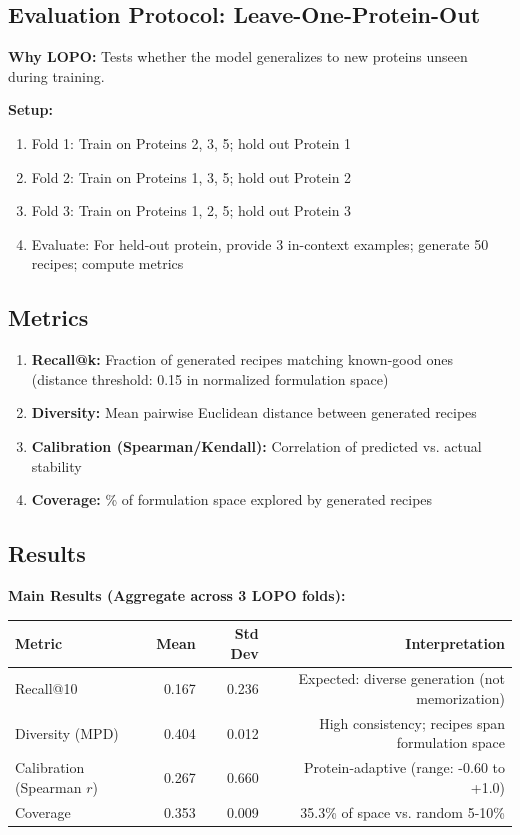 \documentclass[11pt]{article}
\begin{document}
\subsection{Evaluation Protocol: Leave-One-Protein-Out}

\textbf{Why LOPO:} Tests whether the model generalizes to new proteins unseen during training.

\textbf{Setup:}
\begin{enumerate}
    \item Fold 1: Train on Proteins 2, 3, 5; hold out Protein 1
    \item Fold 2: Train on Proteins 1, 3, 5; hold out Protein 2
    \item Fold 3: Train on Proteins 1, 2, 5; hold out Protein 3
    \item Evaluate: For held-out protein, provide 3 in-context examples; generate 50 recipes; compute metrics
\end{enumerate}

\subsection{Metrics}

\begin{enumerate}
    \item \textbf{Recall@k:} Fraction of generated recipes matching known-good ones (distance threshold: 0.15 in normalized formulation space)
    \item \textbf{Diversity:} Mean pairwise Euclidean distance between generated recipes
    \item \textbf{Calibration (Spearman/Kendall):} Correlation of predicted vs. actual stability
    \item \textbf{Coverage:} \% of formulation space explored by generated recipes
\end{enumerate}

\subsection{Results}

\textbf{Main Results (Aggregate across 3 LOPO folds):}

\begin{table}[h]
\centering
\begin{tabular}{lrrr}
\toprule
\textbf{Metric} & \textbf{Mean} & \textbf{Std Dev} & \textbf{Interpretation} \\
\midrule
Recall@10 & 0.167 & 0.236 & Expected: diverse generation (not memorization) \\
Diversity (MPD) & 0.404 & 0.012 & High consistency; recipes span formulation space \\
Calibration (Spearman $r$) & 0.267 & 0.660 & Protein-adaptive (range: -0.60 to +1.0) \\
Coverage & 0.353 & 0.009 & 35.3\% of space vs. random 5-10\% \\
\bottomrule
\end{tabular}
\end{table}
\end{document}
